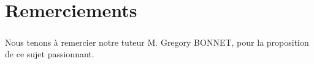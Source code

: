 \chapter*{Remerciements}
		\paragraph{} 
			Nous tenons à remercier notre tuteur M. Gregory BONNET, pour la proposition de ce sujet passionnant.
